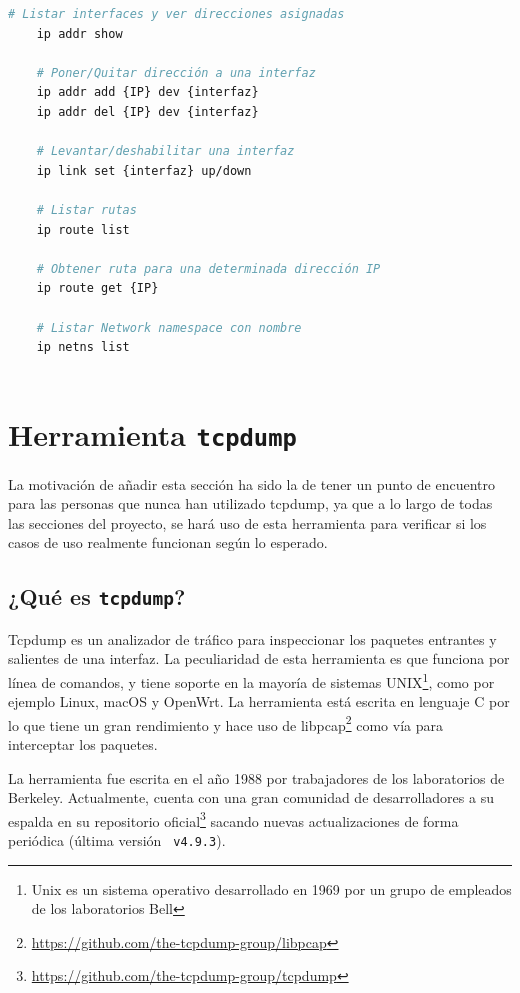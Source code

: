 \begin{lstlisting}[language= bash, style=Consola, caption={Comandos útiles con iproute2},label=code:iproute2_use]
    # Listar interfaces y ver direcciones asignadas
    ip addr show
    
    # Poner/Quitar dirección a una interfaz
    ip addr add {IP} dev {interfaz}
    ip addr del {IP} dev {interfaz}
    
    # Levantar/deshabilitar una interfaz 
    ip link set {interfaz} up/down
    
    # Listar rutas
    ip route list 
    
    # Obtener ruta para una determinada dirección IP
    ip route get {IP}
    
    # Listar Network namespace con nombre
    ip netns list
    

\end{lstlisting}
\newpage

\section{Herramienta \texttt{tcpdump}}
\label{tcpdump}
La motivación de añadir esta sección ha sido la de tener un punto de encuentro para las personas que nunca han utilizado tcpdump, ya que a lo largo de todas las secciones del proyecto, se hará uso de esta herramienta para verificar si los casos de uso realmente funcionan según lo esperado.

\subsection{¿Qué es \texttt{tcpdump}?}

Tcpdump es un analizador de tráfico para inspeccionar los paquetes entrantes y salientes de una interfaz. La peculiaridad de esta herramienta es que funciona por línea de comandos, y tiene soporte en la mayoría de sistemas UNIX\footnote{Unix es un sistema operativo desarrollado en 1969 por un grupo de empleados de los laboratorios Bell}, como por ejemplo Linux, macOS y OpenWrt. La herramienta está escrita en lenguaje C por lo que tiene un gran rendimiento y hace uso de libpcap\footnote{\url{https://github.com/the-tcpdump-group/libpcap}} como vía para interceptar los paquetes.\\
\par
La herramienta fue escrita en el año 1988 por trabajadores de los laboratorios de Berkeley. Actualmente, cuenta con una gran comunidad de desarrolladores a su espalda en su repositorio oficial\footnote{\url{https://github.com/the-tcpdump-group/tcpdump}} sacando nuevas actualizaciones de forma periódica (última versión \texttt{	
v4.9.3}).

